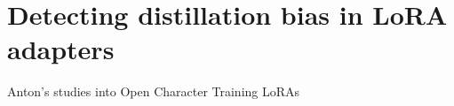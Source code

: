 \section{Detecting distillation bias in LoRA adapters}\label{sec:appendix-d}

Anton’s studies into Open Character Training LoRAs


